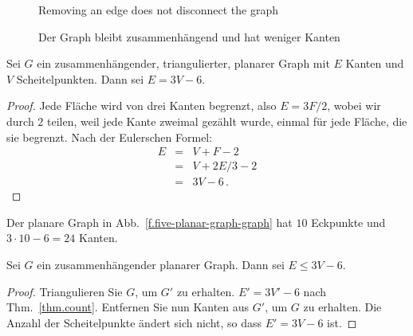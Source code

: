 \begin{figure}[ht]
\begin{minipage}{.45\textwidth}
\caption{Removing an edge does not disconnect the graph}\label{f.five-connected-remains}
\end{minipage}
\hfill
\begin{minipage}{.45\textwidth}
\caption{Der Graph bleibt zusammenhängend und hat weniger Kanten}\label{f.five-connected-fewer}
\end{minipage}
\end{figure}

\begin{theorem}
Sei $G$ ein zusammenhängender, triangulierter, planarer Graph mit $E$ Kanten und $V$ Scheitelpunkten. Dann sei $E= 3V-6$.
\end{theorem}
\begin{proof}
Jede Fläche wird von drei Kanten begrenzt, also $E=3F/2$, wobei wir durch $2$ teilen, weil jede Kante zweimal gezählt wurde, einmal für jede Fläche, die sie begrenzt. Nach der Eulerschen Formel:
\begin{eqnarray*}
E&=&V+F-2\\
&=&V+2E/3-2\\
&=&3V-6\,.
\end{eqnarray*}
\end{proof}

\begin{example}
Der planare Graph in Abb.~\ref{f.five-planar-graph-graph} hat $10$ Eckpunkte und $3\cdot 10-6=24$ Kanten.
\end{example}

\begin{theorem}\label{thm.count}
Sei $G$ ein zusammenhängender planarer Graph. Dann sei $E\leq 3V-6$.
\end{theorem}

\begin{proof}
Triangulieren Sie $G$, um $G'$ zu erhalten. $E'= 3V'-6$ nach Thm.~\ref{thm.count}. Entfernen Sie nun Kanten aus $G'$, um $G$ zu erhalten. Die Anzahl der Scheitelpunkte ändert sich nicht, so dass $E'= 3V-6$ ist.
\end{proof}

